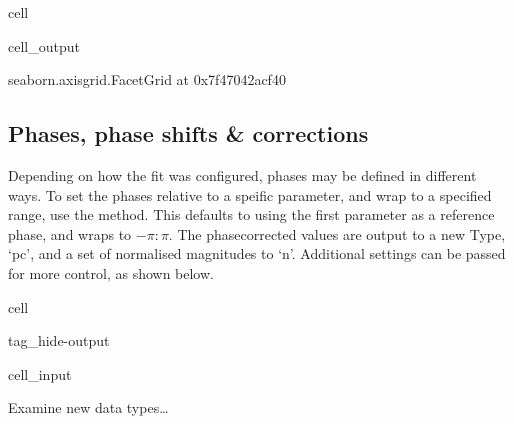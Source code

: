 \documentclass[letterpaper,table,10pt,english]{jupyterBook}
\begin{document}
\begin{sphinxuseclass}{cell}
\begin{sphinxVerbatimOutput}
\begin{sphinxuseclass}{cell_output}
\begin{sphinxVerbatim}[commandchars=\\\{\}]
\PYGZlt{}seaborn.axisgrid.FacetGrid at 0x7f47042acf40\PYGZgt{}
\end{sphinxVerbatim}

\noindent{}

\end{sphinxuseclass}\end{sphinxVerbatimOutput}

\end{sphinxuseclass}

\subsection{Phases, phase shifts \& corrections}
\label{\detokenize{part2/case-study-OCS_290723:phases-phase-shifts-corrections}}
\sphinxAtStartPar
Depending on how the fit was configured, phases may be defined in different ways. To set the phases relative to a speific parameter, and wrap to a specified range, use the  method. This defaults to using the first parameter as a reference phase, and wraps to \(-\pi:\pi\). The phase\sphinxhyphen{}corrected values are output to a new Type, ‘pc’, and a set of normalised magnitudes to ‘n’. Additional settings can be passed for more control, as shown below.

\begin{sphinxuseclass}{cell}
\begin{sphinxuseclass}{tag_hide-output}\begin{sphinxVerbatimInput}

\begin{sphinxuseclass}{cell_input}
\begin{sphinxVerbatim}[commandchars=\\\{\}]
 
\end{sphinxVerbatim}

\end{sphinxuseclass}\end{sphinxVerbatimInput}

\end{sphinxuseclass}
\end{sphinxuseclass}
\sphinxAtStartPar
Examine new data types…
\end{document}
